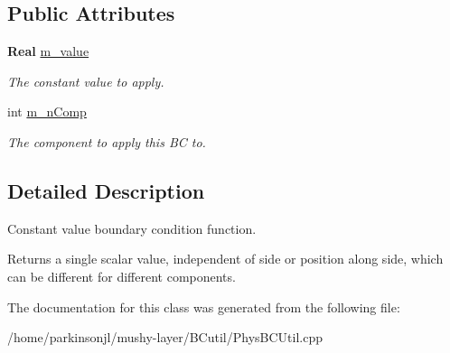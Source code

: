 \subsection*{Public Attributes}
\begin{DoxyCompactItemize}
\item 
\mbox{\label{class_const_value_function_ab7eca155d9349f33bc744398a5b34def}} 
\textbf{ Real} \hyperlink{class_const_value_function_ab7eca155d9349f33bc744398a5b34def}{m\+\_\+value}
\begin{DoxyCompactList}\small\item\em The constant value to apply. \end{DoxyCompactList}\item 
\mbox{\label{class_const_value_function_a9a8923f47bc33ea19749a2b60b9416e2}} 
int \hyperlink{class_const_value_function_a9a8923f47bc33ea19749a2b60b9416e2}{m\+\_\+n\+Comp}
\begin{DoxyCompactList}\small\item\em The component to apply this BC to. \end{DoxyCompactList}\end{DoxyCompactItemize}


\subsection{Detailed Description}
Constant value boundary condition function. 

Returns a single scalar value, independent of side or position along side, which can be different for different components. 

The documentation for this class was generated from the following file\+:\begin{DoxyCompactItemize}
\item 
/home/parkinsonjl/mushy-\/layer/\+B\+Cutil/Phys\+B\+C\+Util.\+cpp\end{DoxyCompactItemize}
